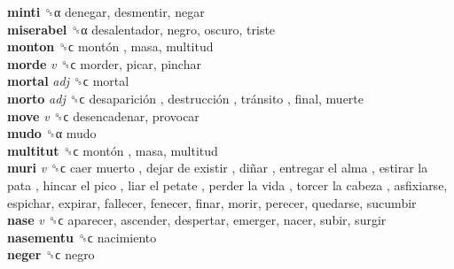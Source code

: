 \textbf{minti} ␝α  denegar, desmentir, negar  \\
\textbf{miserabel} ␝α  desalentador, negro, oscuro, triste  \\
\textbf{monton} ␝ϲ   montón , masa, multitud  \\
\textbf{morde} \emph{v}  ␝ϲ  morder, picar, pinchar  \\
\textbf{mortal} \emph{adj}  ␝ϲ  mortal  \\
\textbf{morto} \emph{adj}  ␝ϲ   desaparición ,  destrucción ,  tránsito , final, muerte  \\
\textbf{move} \emph{v}  ␝ϲ  desencadenar, provocar  \\
\textbf{mudo} ␝α  mudo  \\
\textbf{multitut} ␝ϲ   montón , masa, multitud  \\
\textbf{muri} \emph{v}  ␝ϲ   caer muerto ,  dejar de existir ,  diñar ,  entregar el alma ,  estirar la pata ,  hincar el pico ,  liar el petate ,  perder la vida ,  torcer la cabeza , asfixiarse, espichar, expirar, fallecer, fenecer, finar, morir, perecer, quedarse, sucumbir  \\
\textbf{nase} \emph{v}  ␝ϲ  aparecer, ascender, despertar, emerger, nacer, subir, surgir  \\
\textbf{nasementu} ␝ϲ  nacimiento  \\
\textbf{neger} ␝ϲ  negro  \\
